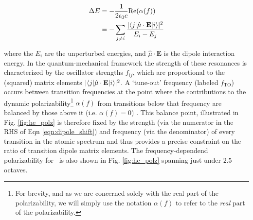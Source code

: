 	\begin{align}
		\Delta E &= -\frac{1}{2\epsilon_0 c}\mathrm{Re}(\alpha(f))\\
		 	&= -\sum_{j\neq i}\frac{|\langle j|\hat{\mu}\cdot\mathrm{\textbf{E}}|i\rangle|^2}{E_i-E_j}
		\label{eqn:dipole_shift}
	\end{align}
	
	\noindent where the $E_i$ are the unperturbed energies, and $\hat{\mu}\cdot\mathrm{\textbf{E}}$ is the dipole interaction energy.
	In the quantum-mechanical framework the strength of these resonances is characterized by the oscillator strengths $f_{ij}$, which are proportional to the (squared) matrix elements $|\langle j|\hat{\mu}\cdot\mathrm{\textbf{E}}|i\rangle|^2$.
	A ‘tune-out’ frequency (labeled $f_\mathrm{TO}$) occurs between transition frequencies at the point where the contributions to the dynamic polarizability\footnote{For brevity, and as we are concerned solely with the real part of the polarizability, we will simply use the notation $\alpha(f)$ to refer to the \emph{real} part of the polarizability.} $\alpha(f)$ from transitions below that frequency are balanced by those above it (i.e. $\alpha(f)=0$) \cite{LeBlanc07}. 
	This balance point, illustrated in Fig. \ref{fig:he_polz} is therefore fixed by the strength (via the numerator in the RHS of Eqn \ref{eqn:dipole_shift}) and frequency (via the denominator) of every transition in the atomic spectrum and thus provides a precise constraint on the ratio of transition dipole matrix elements. 
	The frequency-dependend polarizability for \mhe~is also shown in Fig. \ref{fig:he_polz} spanning just under 2.5 octaves.

